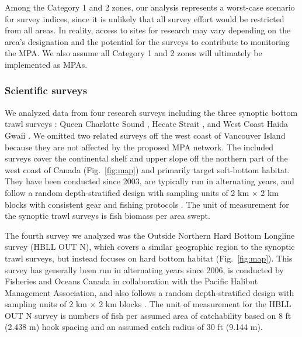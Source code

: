 \documentclass[12pt]{article}
\begin{document}
Among the Category 1 and 2 zones, our analysis represents a worst-case scenario for survey indices, since it is unlikely that all survey effort would be restricted from all areas.
In reality, access to sites for research may vary depending on the area's designation and the potential for the surveys to contribute to monitoring the MPA.
We also assume all Category 1 and 2 zones will ultimately be implemented as MPAs.

\subsubsection*{Scientific surveys}

We analyzed data from four research surveys including the three synoptic bottom trawl surveys \citep[][Fig.~\ref{fig:map}]{sinclair2003syn, anderson2019synopsis}: Queen Charlotte Sound \citep[SYN QCS,][]{williams2018synqcs}, Hecate Strait \citep[SYN HS,][]{wyeth2018synhs}, and West Coast Haida Gwaii \citep[SYN WCHG,][]{williams2018synwchg}. We omitted two related surveys off the west coast of Vancouver Island because they are not affected by the proposed MPA network. The included surveys cover the continental shelf and upper slope off the northern part of the west coast of Canada (Fig.~\ref{fig:map}) and primarily target soft-bottom habitat. They have been conducted since 2003, are typically run in alternating years, and follow a random depth-stratified design with sampling units of 2 km $\times$ 2 km blocks with consistent gear and fishing protocols \citep{sinclair2003syn}. The unit of measurement for the synoptic trawl surveys is fish biomass per area swept.

The fourth survey we analyzed was the Outside Northern Hard Bottom Longline survey (HBLL OUT N), which covers a similar geographic region to the synoptic trawl surveys, but instead focuses on hard bottom habitat \citep{doherty2019hbllout} (Fig.~\ref{fig:map}). This survey has generally been run in alternating years since 2006, is conducted by Fisheries and Oceans Canada in collaboration with the Pacific Halibut Management Association, and also follows a random depth-stratified design with sampling units of 2 km $\times$ 2 km blocks \citep{doherty2019hbllout, anderson2019synopsis}. The unit of measurement for the HBLL OUT N survey is numbers of fish per assumed area of catchability based on 8 ft (2.438 m) hook spacing and an assumed catch radius of 30 ft (9.144 m).
\end{document}
